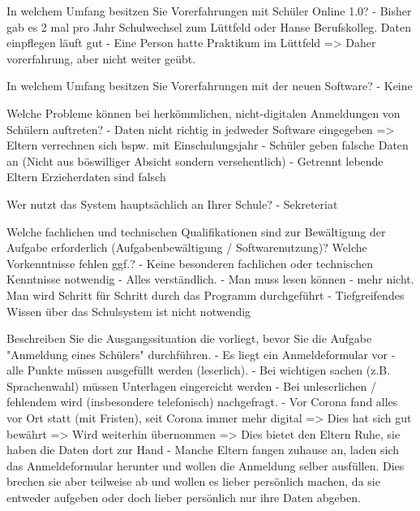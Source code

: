 In welchem Umfang besitzen Sie Vorerfahrungen mit Schüler Online 1.0? 	
- Bisher gab es 2 mal pro Jahr Schulwechsel zum Lüttfeld oder Hanse Berufskolleg. Daten einpflegen läuft gut
- Eine Person hatte Praktikum im Lüttfeld => Daher vorerfahrung, aber nicht weiter geübt.

In welchem Umfang besitzen Sie Vorerfahrungen mit der neuen Software?	
- Keine









Welche Probleme können bei herkömmlichen, nicht-digitalen Anmeldungen von Schülern auftreten?	
- Daten nicht richtig in jedweder Software eingegeben => Eltern verrechnen sich bspw. mit Einschulungsjahr
- Schüler geben falsche Daten an (Nicht aus böswilliger Absicht sondern versehentlich)
- Getrennt lebende Eltern Erzieherdaten sind falsch






Wer nutzt das System hauptsächlich an Ihrer Schule?	
- Sekreteriat









Welche fachlichen und technischen Qualifikationen sind zur Bewältigung der Aufgabe erforderlich (Aufgabenbewältigung / Softwarenutzung)? Welche Vorkenntnisse fehlen ggf.?	
- Keine besonderen fachlichen oder technischen Kenntnisse notwendig
- Alles verständlich. 
- Man muss lesen können - mehr nicht. Man wird Schritt für Schritt durch das Programm durchgeführt
- Tiefgreifendes Wissen über das Schulsystem ist nicht notwendig
 






Beschreiben Sie die Ausgangssituation die vorliegt, bevor Sie die Aufgabe "Anmeldung eines Schülers" durchführen.
- Es liegt ein Anmeldeformular vor 
    - alle Punkte müssen ausgefüllt werden (leserlich). 
    - Bei wichtigen sachen (z.B. Sprachenwahl) müssen Unterlagen eingereicht werden
    - Bei unleserlichen / fehlendem wird (insbesondere telefonisch) nachgefragt. 
- Vor Corona fand alles vor Ort statt (mit Fristen), seit Corona immer mehr digital => Dies hat sich gut bewährt => Wird weiterhin übernommen => Dies bietet den Eltern Ruhe, sie haben die Daten dort zur Hand
- Manche Eltern fangen zuhause an, laden sich das Anmeldeformular herunter und wollen die Anmeldung selber ausfüllen. Dies brechen sie aber teilweise ab und wollen es lieber persönlich machen, da sie entweder aufgeben oder doch lieber persönlich nur ihre Daten abgeben.











